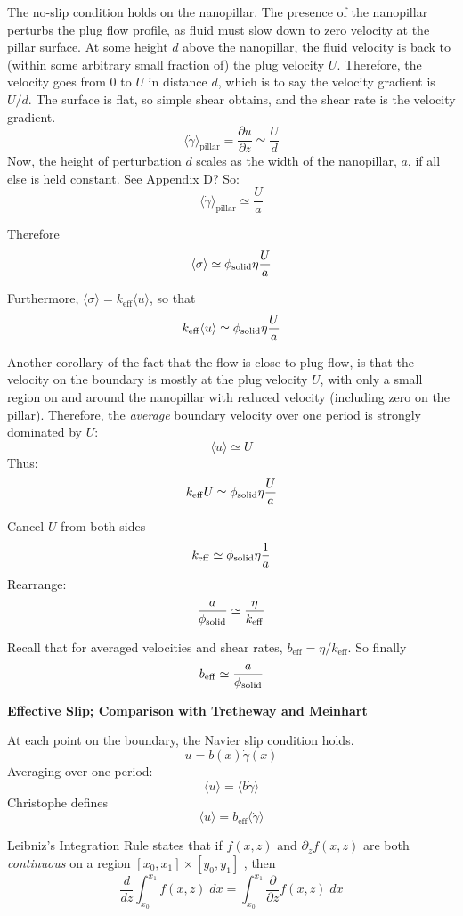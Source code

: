 \documentclass{article}
\newcommand{\beff}{\ensuremath{b_{\mathrm{eff}}}}
\begin{document}
The no-slip condition holds on the nanopillar. The presence of the nanopillar perturbs the plug flow profile, as fluid must slow down to zero velocity at the pillar surface.  At some height $d$ above the nanopillar, the fluid velocity is back to (within some arbitrary small fraction of) the plug velocity $U$.  Therefore, the velocity goes from 0 to $U$ in distance $d$, which is to say the velocity gradient is $U/d$.  The surface is flat, so simple shear obtains, and the shear rate is the velocity gradient.
\[ \langle \dot{\gamma} \rangle_{\mathrm{pillar}} = \frac{\partial u}{\partial z} \simeq \frac{U}{d} \]
Now, the height of perturbation $d$ scales as the width of the nanopillar, $a$, if all else is held constant. See Appendix D? So:
\[ \langle \dot{\gamma} \rangle_{\mathrm{pillar}} \simeq \frac{U}{a} \]

Therefore
\[ \langle \sigma \rangle \simeq \phi_{\mathrm{solid}} \eta \frac{U}{a}  \]

Furthermore, $\langle \sigma \rangle = k_{\mathrm{eff}} \langle u \rangle$, so that
\[ k_{\mathrm{eff}} \langle u \rangle \simeq \phi_{\mathrm{solid}} \eta \frac{U}{a}  \]
 
Another corollary of the fact that the flow is close to plug flow, is that the velocity on the boundary is mostly at the plug velocity $U$, with only a small region on and around the nanopillar with reduced velocity (including zero on the pillar).  Therefore, the \emph{average} boundary velocity over one period is strongly dominated by $U$:
\[ \langle u \rangle \simeq U \]
Thus:
\[ k_{\mathrm{eff}} U \simeq \phi_{\mathrm{solid}} \eta \frac{U}{a}  \]

Cancel $U$ from both sides
\[ k_{\mathrm{eff}} \simeq \phi_{\mathrm{solid}} \eta \frac{1}{a}  \]
Rearrange:
\[ \frac{a}{\phi_{\mathrm{solid}}} \simeq \frac{\eta}{k_{\mathrm{eff}}} \]

Recall that for averaged velocities and shear rates, $\beff = \eta / k_{\mathrm{eff}}$. So finally
\[ \beff \simeq \frac{a}{\phisol} \]

\textbf{Effective Slip; Comparison with Tretheway and Meinhart}

At each point on the boundary, the Navier slip condition holds.
\[ u = b(x) \dot{\gamma}(x) \]
Averaging over one period:
\[ \langle u \rangle = \langle b \dot{\gamma} \rangle \]
Christophe defines
\[ \langle u \rangle = \beff \langle \dot{\gamma} \rangle  \]

Leibniz's Integration Rule states that if $f(x,z)$ and $\partial_z f(x,z)$ are both \emph{continuous} on a region $[x_0,x_1] \times [y_0,y_1]$ , then
\[ \frac{d}{dz} \int_{x_0}^{x_1} f(x,z) \;dx = 
\int_{x_0}^{x_1} \frac{\partial}{\partial z} f(x,z) \;dx  \]
\end{document}
